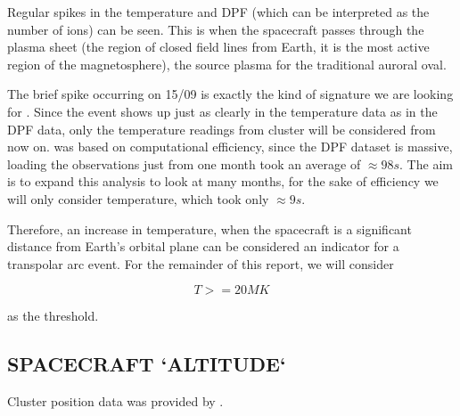 \documentclass{article}
\begin{document}
\begin{multicols}{2}

Regular spikes in the temperature and DPF (which can be interpreted as the number of ions) can be seen. This is when the spacecraft passes through the plasma sheet (the region of closed field lines from Earth, it is the most active region of the magnetosphere), the source plasma for the traditional auroral oval.

The brief spike occurring on 15/09 is exactly the kind of signature we are looking for \cite{Fear1506}. Since the event shows up just as clearly in the temperature data as in the DPF data, only the temperature readings from cluster will be considered from now on. was based on computational efficiency, since the DPF dataset is massive, loading the observations just from one month took an average of $\approx 98s$. The aim is to expand this analysis to look at many months, for the sake of efficiency we will only consider temperature, which took only $\approx 9s$.

Therefore, an increase in temperature, when the spacecraft is a significant distance from Earth's orbital plane can be considered an indicator for a transpolar arc event. For the remainder of this report, we will consider 

\begin{equation}
    T >= 20MK
\end{equation}

\noindent as the threshold.

\subsection{SPACECRAFT `ALTITUDE`}
Cluster position data was provided by \cite{cdms}. 


\end{multicols}
\end{document}
